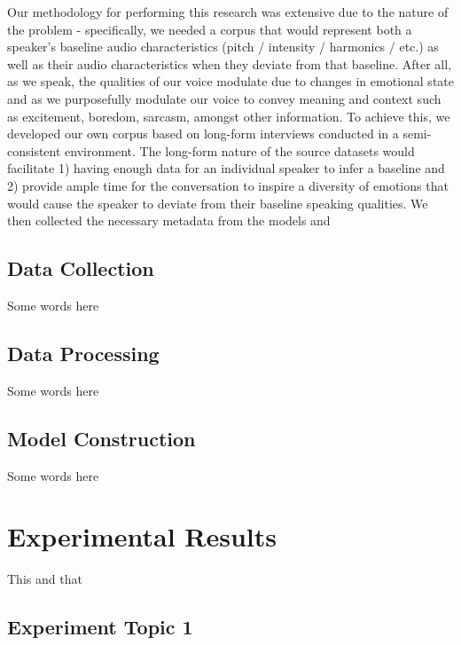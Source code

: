 \documentclass[10pt,twocolumn,letterpaper]{article}
\begin{document}
Our methodology for performing this research was extensive due to the nature of the problem - specifically, we needed a corpus that would represent both a speaker's baseline audio characteristics (pitch / intensity / harmonics / etc.) as well as their audio characteristics when they deviate from that baseline. After all, as we speak, the qualities of our voice modulate due to changes in emotional state and as we purposefully modulate our voice to convey meaning and context such as excitement, boredom, sarcasm, amongst other information. To achieve this, we developed our own corpus based on long-form interviews conducted in a semi-consistent environment. The long-form nature of the source datasets would facilitate 1) having enough data for an individual speaker to infer a baseline and 2) provide ample time for the conversation to inspire a diversity of emotions that would cause the speaker to deviate from their baseline speaking qualities. We then collected the necessary metadata from the models and  

\subsection{Data Collection}

Some words here

\subsection{Data Processing}

Some words here

\subsection{Model Construction}

Some words here

\section{Experimental Results}
\label{sec:results}

This and that

\subsection{Experiment Topic 1}
\end{document}
